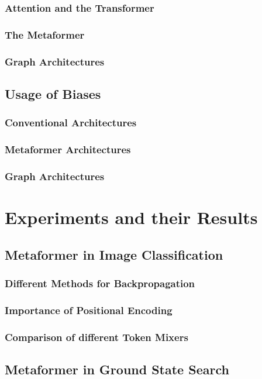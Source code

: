 \documentclass[
headings=optiontohead,              %
12pt,                               %
DIV=13,                             %
twoside=false,                      %
open=right,                         %
BCOR=10mm,                          %
toc=bibliographynumbered            %
]{scrreport}
\begin{document}
        \subsection{Attention and the Transformer}
        \subsection{The Metaformer}
        \subsection{Graph Architectures}
    \section{Usage of Biases}
        \subsection{Conventional Architectures}
        \subsection{Metaformer Architectures}
        \subsection{Graph Architectures}

\chapter{Experiments and their Results}
    \section{Metaformer in Image Classification}
        \subsection{Different Methods for Backpropagation}
        \subsection{Importance of Positional Encoding}
        \subsection{Comparison of different Token Mixers}

    \section{Metaformer in Ground State Search}
\end{document}
